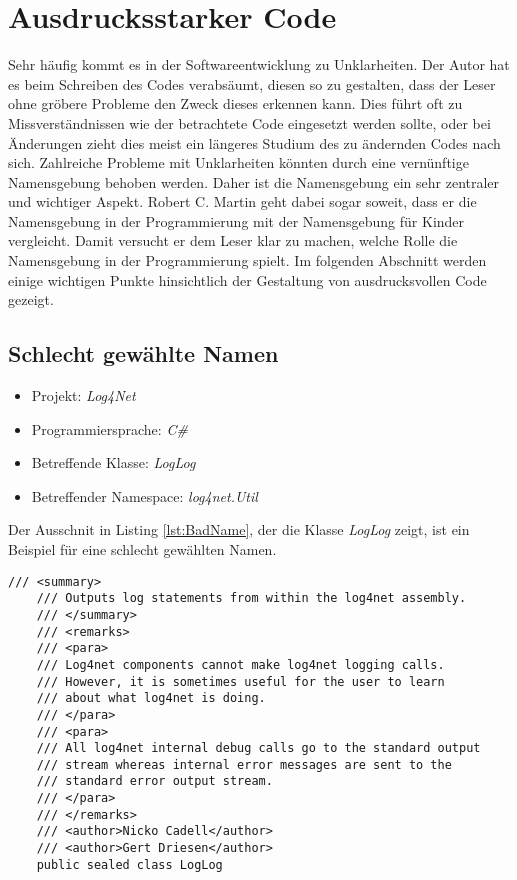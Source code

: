 \section{Ausdrucksstarker Code}
Sehr häufig kommt es in der Softwareentwicklung zu Unklarheiten. Der Autor hat es beim Schreiben des Codes verabsäumt, diesen so zu gestalten, dass der Leser ohne gröbere Probleme den Zweck dieses erkennen kann. Dies führt oft zu Missverständnissen wie der betrachtete Code eingesetzt werden sollte, oder bei Änderungen zieht dies meist ein längeres Studium des zu ändernden Codes nach sich. Zahlreiche Probleme mit Unklarheiten könnten durch eine vernünftige Namensgebung behoben werden. Daher ist die Namensgebung ein sehr zentraler und wichtiger Aspekt. Robert C. Martin geht dabei sogar soweit, dass er die Namensgebung in der Programmierung mit der Namensgebung für Kinder vergleicht. Damit versucht er dem Leser klar zu machen, welche Rolle die Namensgebung in der Programmierung spielt. Im
folgenden Abschnitt werden einige wichtigen Punkte hinsichtlich der Gestaltung von ausdrucksvollen Code gezeigt.

\subsection{Schlecht gewählte Namen}
\begin{itemize}
	\item Projekt: \textit{Log4Net}
	\item Programmiersprache: \textit{C\#}
	\item Betreffende Klasse: \textit{LogLog}
	\item Betreffender Namespace: \textit{log4net.Util}
\end{itemize}

\SuperPar Der Ausschnit in Listing \ref{lst:BadName}, der die Klasse \textit{LogLog} zeigt, ist ein Beispiel für eine schlecht gewählten Namen.

\begin{lstlisting}[language={[Sharp]C}, caption=Beispiele für schlechte Namensgebung, label=lst:BadName]
/// <summary>
	/// Outputs log statements from within the log4net assembly.
	/// </summary>
	/// <remarks>
	/// <para>
	/// Log4net components cannot make log4net logging calls.
	/// However, it is sometimes useful for the user to learn 
	/// about what log4net is doing.
	/// </para>
	/// <para>
	/// All log4net internal debug calls go to the standard output 
	/// stream whereas internal error messages are sent to the 
	/// standard error output stream.
	/// </para>
	/// </remarks>
	/// <author>Nicko Cadell</author>
	/// <author>Gert Driesen</author>
	public sealed class LogLog
\end{lstlisting}

